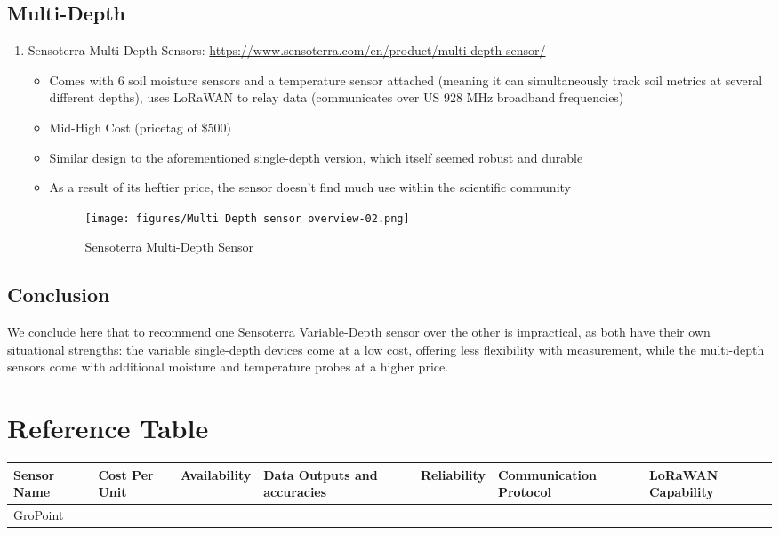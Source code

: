 \documentclass{article}
\begin{document}
\subsection{Multi-Depth}
\begin{enumerate}
\item Sensoterra Multi-Depth Sensors: \url{https://www.sensoterra.com/en/product/multi-depth-sensor/}
\begin{itemize}

    \item Comes with 6 soil moisture sensors and a temperature sensor attached (meaning it can simultaneously track soil metrics at several different depths), uses LoRaWAN to relay data (communicates over US 928 MHz broadband frequencies)
    \item Mid-High Cost (pricetag of \$500)
    \item Similar design to the aforementioned single-depth version, which itself seemed robust and durable
    \item As a result of its heftier price, the sensor doesn't find much use within the scientific community
    
 \begin{figure}[htp]
    \centering
    \texttt{[image: figures/Multi Depth sensor overview-02.png]}
    \caption{Sensoterra Multi-Depth Sensor}
\end{figure}

\end{itemize}
\end{enumerate}

\subsection{Conclusion}
We conclude here that to recommend one Sensoterra Variable-Depth sensor over the other is impractical, as both have their own situational strengths: the variable single-depth devices come at a low cost, offering less flexibility with measurement, while the multi-depth sensors come with additional moisture and temperature probes at a higher price.

\section{Reference Table}

\begin{tabularx}{0.8\textwidth} { 
  | >{\raggedright\arraybackslash}X 
  | >{\centering\arraybackslash}X 
  | >{\raggedleft\arraybackslash}X | }
 \hline
 Sensor Name & Cost Per Unit & Availability & Data Outputs and accuracies & Reliability & Communication Protocol & LoRaWAN Capability  \\
 \hline
 GroPoint  \\
\hline
\end{tabularx}
\end{document}
